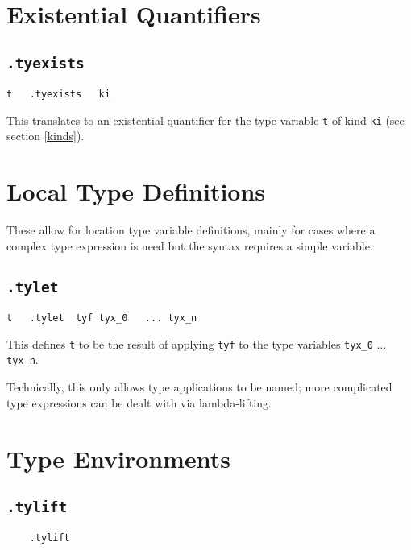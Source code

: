 \documentclass{report}
\newcommand\stringcode[1]{\texttt{#1}}
\begin{document}
\section{Existential Quantifiers}
\label{type_exists}

\subsection{\stringcode{.tyexists}}

\begin{verbatim}
t	.tyexists	ki
\end{verbatim}

This translates to an existential quantifier for the type variable \stringcode{t} of kind \stringcode{ki} (see section \ref{kinds}).

\section{Local Type Definitions}
\label{type_let}

These allow for location type variable definitions,
mainly for cases where a complex type expression is need but the syntax requires a simple variable.

\subsection{\stringcode{.tylet}}

\begin{verbatim}
t	.tylet	tyf	tyx_0	...	tyx_n
\end{verbatim}

This defines \stringcode{t} to be the result of applying \stringcode{tyf} to the type variables \stringcode{tyx\_0} $\ldots$ \stringcode{tyx\_n}.

Technically, this only allows type applications to be named;
more complicated type expressions can be dealt with via lambda-lifting.

\section{Type Environments}
\label{type_context}

\subsection{\stringcode{.tylift}}

\begin{verbatim}
	.tylift
\end{verbatim}
\end{document}
